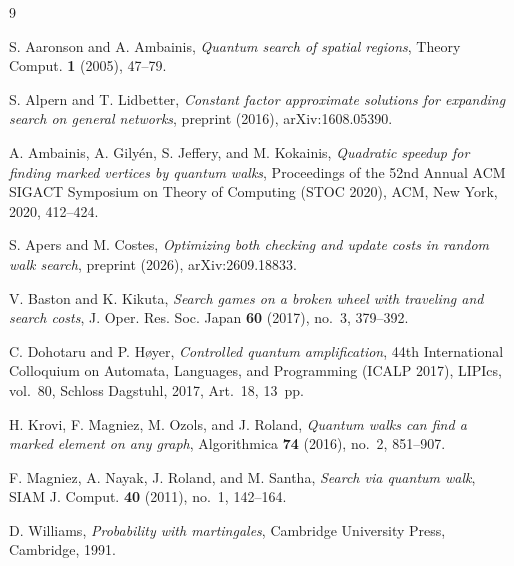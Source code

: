 \documentclass{amsart}
\theoremstyle{plain}
\theoremstyle{definition}
\theoremstyle{remark}
\begin{document}
\begin{thebibliography}{9}

S. Aaronson and A. Ambainis, \emph{Quantum search of spatial regions}, Theory Comput. \textbf{1} (2005), 47--79.

S. Alpern and T. Lidbetter, \emph{Constant factor approximate solutions for expanding search on general networks}, preprint (2016), arXiv:1608.05390.

A. Ambainis, A. Gilyén, S. Jeffery, and M. Kokainis, \emph{Quadratic speedup for finding marked vertices by quantum walks}, Proceedings of the 52nd Annual ACM SIGACT Symposium on Theory of Computing (STOC 2020), ACM, New York, 2020, 412--424.

S. Apers and M. Costes, \emph{Optimizing both checking and update costs in random walk search}, preprint (2026), arXiv:2609.18833.

V. Baston and K. Kikuta, \emph{Search games on a broken wheel with traveling and search costs}, J. Oper. Res. Soc. Japan \textbf{60} (2017), no.~3, 379--392.

C. Dohotaru and P. H{\o}yer, \emph{Controlled quantum amplification}, 44th International Colloquium on Automata, Languages, and Programming (ICALP 2017), LIPIcs, vol.~80, Schloss Dagstuhl, 2017, Art.~18, 13~pp.

H. Krovi, F. Magniez, M. Ozols, and J. Roland, \emph{Quantum walks can find a marked element on any graph}, Algorithmica \textbf{74} (2016), no.~2, 851--907.

F. Magniez, A. Nayak, J. Roland, and M. Santha, \emph{Search via quantum walk}, SIAM J. Comput. \textbf{40} (2011), no.~1, 142--164.

D. Williams, \emph{Probability with martingales}, Cambridge University Press, Cambridge, 1991.

\end{thebibliography}
\end{document}
